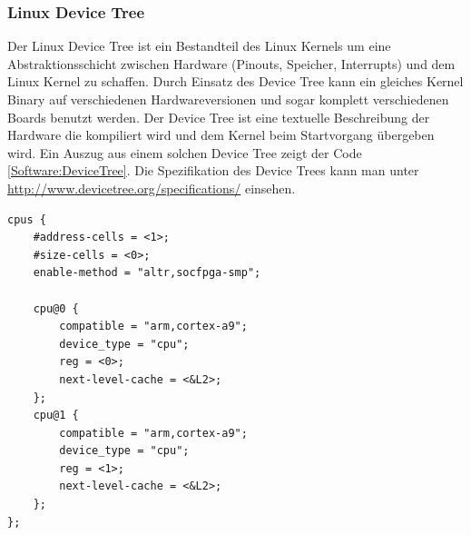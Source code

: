 \subsubsection{Linux Device Tree} 
Der Linux Device Tree ist ein Bestandteil des Linux Kernels um eine Abstraktionsschicht zwischen Hardware (Pinouts, Speicher, Interrupts) und dem Linux Kernel zu schaffen. Durch Einsatz des Device Tree kann ein gleiches Kernel Binary auf verschiedenen Hardwareversionen und sogar komplett verschiedenen Boards benutzt werden. Der Device Tree ist eine textuelle Beschreibung der Hardware die kompiliert wird und dem Kernel beim Startvorgang übergeben wird. Ein Auszug aus einem solchen Device Tree zeigt der Code \ref{Software:DeviceTree}. Die Spezifikation des Device Trees kann man unter \href{http://www.devicetree.org/specifications/}{http://www.devicetree.org/specifications/} einsehen.

\begin{lstlisting}[caption={[Auszug aus socfpga.dtsi]Auszug aus socfpga.dtsi \cite[Version~4.7, \texttt{arch/arm/boot/dts/socfpga.dtsi}]{Linux_Kernel}}, label=Software:DeviceTree]
cpus {
	#address-cells = <1>;
	#size-cells = <0>;
	enable-method = "altr,socfpga-smp";

	cpu@0 {
		compatible = "arm,cortex-a9";
		device_type = "cpu";
		reg = <0>;
		next-level-cache = <&L2>;
	};
	cpu@1 {
		compatible = "arm,cortex-a9";
		device_type = "cpu";
		reg = <1>;
		next-level-cache = <&L2>;
	};
};
\end{lstlisting}

